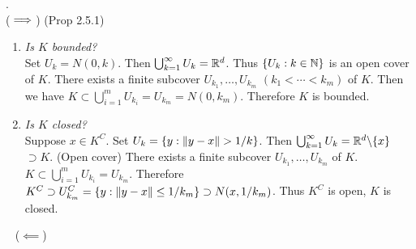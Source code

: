 \pagebreak
\pf.\\
($\implies$) (Prop 2.5.1)
\begin{enumerate}
	\item \textit{Is $K$ bounded?}\\
	Set $U_k = N(0, k)$. Then $\bigcup_{k=1}^\infty U_k = \mathbb{R}^d$. Thus $\{U_k: k\in \mathbb{N} \}$ is an open cover of $K$. There exists a finite subcover $U_{k_1}, \dots, U_{k_m}$ $(k_1<\cdots < k_m)$ of $K$. Then we have $K\subset \bigcup_{i=1}^m U_{k_i} = U_{k_m} = N(0, k_m)$. Therefore $K$ is bounded.
	\item \textit{Is $K$ closed?}\\
	Suppose $x\in K^C$. Set $U_k = \{y: \left\lVert y-x\right\rVert > 1/k \}$. Then $\bigcup_{k=1}^\infty U_k = \mathbb{R}^d \backslash \{x \}$ $\supset K$. (Open cover) There exists a finite subcover $U_{k_1}, \dots, U_{k_m}$ of $K$. $K\subset \bigcup_{i=1}^m U_{k_i} = U_{k_m}$. Therefore $K^C \supset U_{k_m}^C = \{y:\left\lVert y-x\right\rVert\leq 1/k_m \} \supset N(x, 1/k_m)$. Thus $K^C$ is open, $K$ is closed.
\end{enumerate}~
($\impliedby$)
